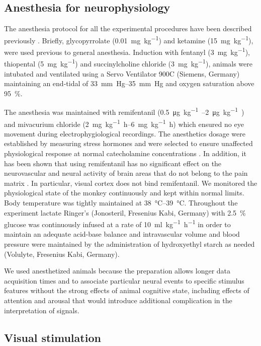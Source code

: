 \subsection{Anesthesia for neurophysiology}

The anesthesia protocol for all the experimental procedures have been described previously \citep{Logothetis1999,Logothetis2001}.
Briefly, glycopyrrolate (\SI{0.01}{mg.{kg}^{-1}}) and ketamine (\SI{15}{mg.{kg}^{-1}}), were used previous to general anesthesia.
Induction with fentanyl (\SI{3}{mg.{kg}^{-1}}), thiopental (\SI{5}{mg.{kg}^{-1}}) and succinylcholine chloride (\SI{3}{mg.{kg}^{-1}}), animals were intubated and ventilated using a Servo Ventilator 900C (Siemens, Germany) maintaining an end-tidal  of \SIrange{33}{35}{mm.Hg} and oxygen saturation above \SI{95}{\percent}.

The anesthesia was maintained with remifentanil (\SIrange{0.5}{2}{\micro\gram.kg^{-1}.\min}) and mivacurium chloride (\SIrange{2}{6}{mg.kg^{-1}.h}) which ensured no eye movement during electrophygiological recordings.
The anesthetics dosage were established by measuring stress hormones and were selected to ensure unaffected physiological response at normal catecholamine concentrations \citep{Logothetis1999}.
In addition, it has been shown that using remifentanil has no significant effect on the neurovascular and neural activity of brain areas that do not belong to the pain matrix \citep{Goense2008,Zappe2008}.
In particular, visual cortex does not bind remifentanil.
We monitored the physiological state of the monkey continuously and kept within normal limits.
Body temperature was tightly maintained at \SIrange{38}{39}{\celsius}.
Throughout the experiment lactate Ringer's (Jonosteril, Fresenius Kabi, Germany) with \SI{2.5}{\percent} glucose was continuously infused at a rate of \SI{10}{ml.kg^{-1}.h^{-1}} in order to maintain an adequate acid-base balance and intravascular volume and blood pressure were maintained by the administration of hydroxyethyl starch as needed (Volulyte, Fresenius Kabi, Germany).

We used anesthetized animals because the preparation allows longer data acquisition times and to associate particular neural events to specific stimulus features without the strong effects of animal cognitive state, including effects of attention and arousal that would introduce additional complication in the interpretation of signals.


\subsection{Visual stimulation}

